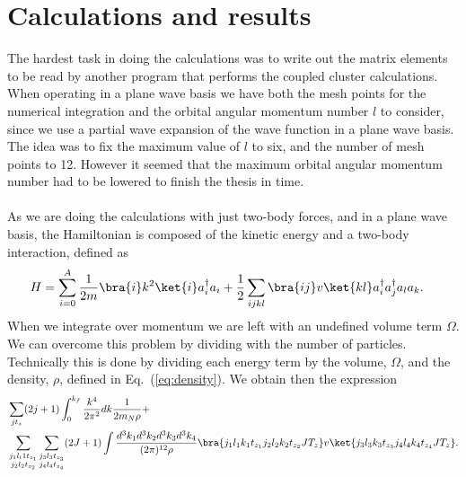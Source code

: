 \chapter{Calculations and results}

The hardest task in doing the calculations was to write out the matrix
elements to be read by another program that performs the coupled
cluster calculations.%
\\
When operating in a plane wave basis we have both the mesh points for the numerical
integration and the orbital angular momentum number $l$  to consider, since we use a
partial wave expansion of the wave function in a plane wave basis. 
The idea was to fix the maximum value of $l$ to six, and
the number of mesh points to 12. 
However it seemed that the maximum orbital angular
momentum number had to be lowered to finish the thesis in time.\\%
\\
As we are doing the calculations with just two-body forces, and in a plane wave
basis, the Hamiltonian is composed of the kinetic energy  and a
two-body interaction, defined as
\begin{equation*}
		\begin{split}
				&H=\sum_{i=0}^A\frac{1}{2m}\bra{i}k^2\ket{i}a^\dagger_ia_i + \frac{1}{2}\sum_{ijkl}\bra{ij}v\ket{kl}a^\dagger_ia^\dagger_ja_la_k.
		\end{split}
\end{equation*}
When we integrate over momentum we are left with an undefined volume term
$\Omega$. We can overcome this problem by dividing with the number of particles. 
Technically this is done by dividing each energy term by the volume, $\Omega$, and 
the density, $\rho$, defined in Eq.~(\eqref{eq:density}). We obtain then the expression
\begin{equation*}
		\begin{split}
			&	 \sum_{jt_z} (2j+1)\int _0^{k_f}\frac{k^4}{2\pi^2}dk\frac{1}{2m_N\rho}+\\
			&	\sum_{\substack{j_1l_l1t_{z_1}\\j_2l_2t_{z_2}}}\sum_{\substack{j_3l_3t_{z_3}\\j_4l_4t_{z_4}}}(2J+1)\int \frac{d^3k_1 d^3k_2 d^3k_3 d^3k_4}{(2\pi)^{12}\rho}\bra{j_1l_1k_1t_{z_1}j_2l_2k_2t_{z_2}JT_z}v
				\ket{j_3l_3k_3t_{z_3}j_4l_4k_4t_{z_4}JT_z}.
		\end{split}
\end{equation*}
